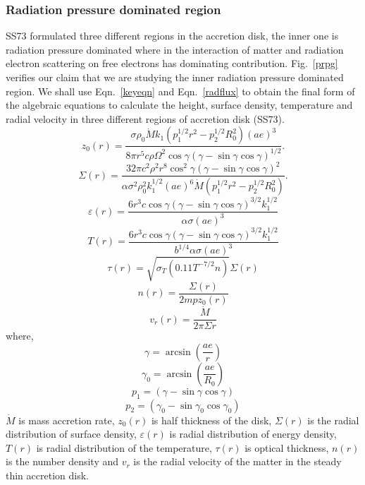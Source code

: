 \documentclass[useAMS,usenatbib]{mn2e}
\begin{document}
\subsubsection{Radiation pressure dominated region}
SS73 formulated three different regions in the accretion disk, the inner one is radiation pressure dominated where in the interaction of matter and radiation electron scattering on free electrons has dominating contribution. Fig.~\ref{prpg} verifies our claim that we are studying the inner radiation pressure dominated region. We shall use Eqn.~\ref{keyeqn} and Eqn.~\ref{radflux} to obtain the final form of the algebraic equations to calculate the height, surface density, temperature and radial velocity in three different regions of accretion disk (SS73).
\begin{equation}
z_0(r) = \frac{\sigma\rho_0\dot{M}k_1\left(p_1^{1/2}r^2 - p_2^{1/2}R_0^2\right)(ae)^3}{8\pi r^5 c \rho \Omega^2\cos\gamma(\gamma - \sin\gamma\cos\gamma)^{1/2}}.
\end{equation}
\begin{equation}
\Sigma(r) = \frac{32\pi c^2\rho^2 r^8 \cos^2{\gamma}(\gamma - \sin\gamma\cos\gamma)^2}{\alpha\sigma^2\rho_0^2 k_1^{1/2}(ae)^6\dot{M}\left(p_1^{1/2}r^2 - p_2^{1/2}R_0^2\right)}.
\end{equation}
\begin{equation}
\varepsilon(r) = \frac{6 r^3 c \cos\gamma(\gamma - \sin\gamma\cos\gamma)^{3/2}k_1^{1/2}}{\alpha\sigma (ae)^3}
\end{equation}
\begin{equation}
T(r) = \frac{6r^3 c \cos\gamma (\gamma - \sin\gamma\cos\gamma)^{3/2}k_1^{1/2}}{b^{1/4}\alpha\sigma (ae)^3}
\end{equation}
\begin{equation}
\tau (r) = \sqrt{\sigma_T(0.11 T^{-7/2}n)}\Sigma(r)
\end{equation}
\begin{equation}
n(r) = \frac{\Sigma(r)}{2mpz_0(r)}
\end{equation}
\begin{equation}
v_r(r) = \frac{\dot{M}}{2\pi\Sigma r}
\end{equation}
where, 
\begin{equation} 
\gamma = \arcsin(\frac{ae}{r}) 
\end{equation}
\begin{equation}
\gamma_0 = \arcsin(\frac{ae}{R_0})
\end{equation}
\begin{equation}
p_1 = (\gamma - \sin\gamma\cos\gamma)
\end{equation}
\begin{equation}
p_2 = (\gamma_0 - \sin\gamma_0\cos\gamma_0)
\end{equation}
$\dot{M}$ is mass accretion rate, $z_0(r)$ is half thickness of the disk, $\Sigma(r)$ is the radial distribution of surface density, $\varepsilon(r)$ is radial distribution of energy density, $T(r)$ is radial distribution of the temperature, $\tau(r)$ is optical thickness, $n(r)$ is the number density and $v_r$ is the radial velocity of the matter in the steady thin accretion disk.
\end{document}
